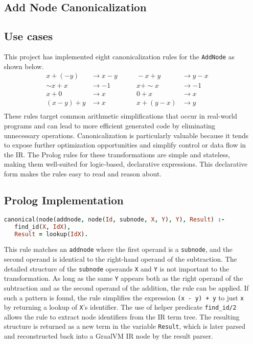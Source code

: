 \lstset{
    aboveskip=5pt,
    belowskip=5pt
}
\subsection{Add Node Canonicalization}
\subsection*{Use cases}
This project has implemented eight canonicalization rules for the \texttt{AddNode} as shown below.
\begin{align*}
    x + (-y)          &\rightarrow x - y        &\qquad -x + y           &\rightarrow y - x \\
    \sim x + x        &\rightarrow -1           &\qquad x + \sim x       &\rightarrow -1     \\
    x + 0             &\rightarrow x            &\qquad 0 + x            &\rightarrow x      \\
    (x - y) + y       &\rightarrow x            &\qquad x + (y - x)      &\rightarrow y      \\
\end{align*}
These rules target common arithmetic simplifications that occur in real-world programs and can lead to more efficient generated code by eliminating unnecessary operations.
Canonicalization is particularly valuable because it tends to expose further optimization opportunities and simplify control or data flow in the IR.
The Prolog rules for these transformations are simple and stateless, making them well-suited for logic-based, declarative expressions.
This declarative form makes the rules easy to read and reason about.

\subsection*{Prolog Implementation}
\begin{lstlisting}[language=Prolog]
% (x - y) + y -> x
canonical(node(addnode, node(Id, subnode, X, Y), Y), Result) :-
   find_id(X, IdX),
   Result = lookup(IdX).
\end{lstlisting}
    
This rule matches an \texttt{addnode} where the first operand is a \texttt{subnode}, and the second operand is identical to the right-hand operand of the subtraction.
The detailed structure of the \texttt{subnode} operands \texttt{X} and \texttt{Y} is not important to the transformation. 
As long as the same \texttt{Y} appears both as the right operand of the subtraction and as the second operand of the addition, the rule can be applied. 
If such a pattern is found, the rule simplifies the expression \texttt{(x - y) + y} to just \texttt{x} by returning a lookup of \texttt{X}'s identifier. 
The use of helper predicate \texttt{find\_id/2} allows the rule to extract node identifiers from the IR term tree. 
The resulting structure is returned as a new term in the variable \texttt{Result}, which is later parsed and reconstructed back into a GraalVM IR node by the result parser.

